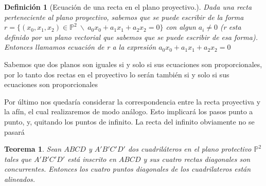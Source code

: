 \documentclass[11pt, a4paper]{article}
\newif\IfInSansMode
\theoremstyle{theorem-style}
\newtheorem{nth}{Teorema}[section]
\theoremstyle{definition-style}
\newtheorem{ndef}{Definición}[section]
\theoremstyle{remark-style}
\theoremstyle{example-style}
\begin{document}
\begin{ndef}[Ecuación de una recta en el plano proyectivo.]
Dada una recta perteneciente al plano proyectivo, sabemos que se puede escribir de la forma $r = \{(x_0,x_1,x_2) \in \mathbb{P}^2\ \backslash\ a_0x_0+a_1x_1+a_2x_2 = 0\}$ con algun $a_i \neq 0$ (r esta definido por un plano vectorial que sabemos que se puede escribir de esa forma). Entonces llamamos ecuación de r a la expresión $a_0x_0+a_1x_1+a_2x_2 = 0$ 
\end{ndef}
Sabemos que dos planos son iguales si y solo si sus ecuaciones son proporcionales, por lo tanto dos rectas en el proyectivo lo serán también si y solo si sus ecuaciones son proporcionales

Por  último nos quedaría considerar la correspondencia entre la recta proyectiva y la afín, el cual realizaremos de modo análogo. Esto implicará los pasos punto a punto, y, quitando los puntos de infinito. La recta del infinito obviamente no se pasará

\begin{nth}
	Sean $ABCD$ y $A'B'C'D'$ dos cuadriláteros en el plano protectivo $\mathbb{P}^2$ tales que $A'B'C'D'$ está inscrito en $ABCD$ y sus cuatro rectas diagonales son concurrentes. Entonces  los cuatro puntos diagonales de los cuadrilateros están alineados.
\end{nth}
\end{document}
